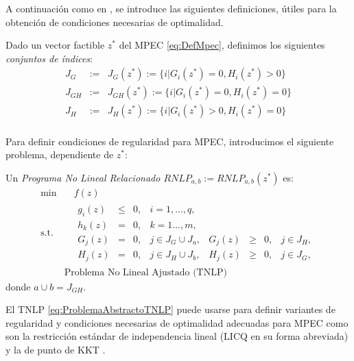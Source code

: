 A continuación como en \cite{Flegel2003AFJ}, se introduce las siguientes definiciones, \'utiles para la obtenci\'on de condiciones necesarias de optimalidad.
\begin{definition}
Dado un vector factible $z^*$ del MPEC \eqref{eq:DefMpec}, definimos los siguientes \textit{conjuntos de índices}:
\begin{equation}
\begin{aligned}
J_G&:=& J_G(z^*) := \{i|G_i(z^*) = 0, H_i(z^*) > 0\} \\
J_{GH}&:=& J_{GH}(z^*) := \{i|G_i(z^*) = 0, H_i(z^*) = 0\}  \\
J_H &:= &J_H(z^*) := \{i|G_i(z^*) > 0, H_i(z^*) = 0\}  \\
\end{aligned}
\label{eq:ConjuntoDeIndices} 
\end{equation}
\end{definition}

Para definir condiciones de regularidad para MPEC, introducimos el siguiente problema, dependiente de $z^*$:

\begin{definition}

Un \textit{Programa No Lineal Relacionado $RNLP_{a,b} := RNLP_{a,b}(z^*)$} es:
\begin{equation}
\begin{aligned}
\min  &\quad  f(z)  \\
\text{s.t.} &\quad \begin{matrix} g_i(z)& \leq& 0, &i=1,\ldots,q, \\ h_k(z) &=& 0,&k=1\ldots,m, \\
 G_j(z) &=& 0, & j\in J_G\cup J_{a},& G_j(z) &\geq& 0, & j\in J_H,\\ 
H_j(z) &=& 0, & j\in J_H\cup J_{b},& H_j(z) &\geq& 0, & j\in J_G,\end{matrix}\\
& \text{Problema No Lineal Ajustado (TNLP)}  
\end{aligned}
\label{eq:ProblemaAbstractoTNLP}
\end{equation}
    donde $a\cup b=J_{GH}$.
\end{definition}

El TNLP \eqref{eq:ProblemaAbstractoTNLP} puede  usarse para definir variantes de regularidad y condiciones necesarias de optimalidad  adecuadas para MPEC como son la  restricción estándar de independencia lineal (LICQ en su forma abreviada) y la de punto de KKT .

